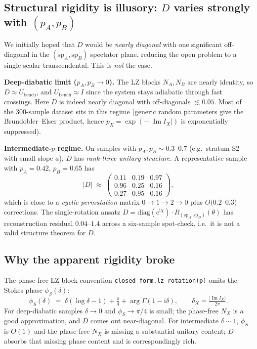 \documentclass[11pt]{article}
\newcommand{\ii}{\mathrm i}\newcommand{\dd}{\mathrm d}
\newcommand{\im}{\operatorname{Im}}
\begin{document}
\subsection{Structural rigidity is illusory: $D$ varies strongly with $(p_A,p_B)$}

We initially hoped that $D$ would be \emph{nearly diagonal} with one
significant off-diagonal in the $(\mathrm{sp}_A,\mathrm{sp}_B)$
spectator plane, reducing the open problem to a single scalar
transcendental. This is \emph{not} the case.

\textbf{Deep-diabatic limit ($p_A,p_B\to 0$).} The LZ blocks $N_A,N_B$
are nearly identity, so $D\approx U_{\text{bench}}$, and
$U_{\text{bench}}\approx I$ since the system stays adiabatic through
fast crossings. Here $D$ is indeed nearly diagonal with off-diagonals
$\lesssim 0.05$. Most of the 300-sample dataset sits in this regime
(generic random parameters give the Brundobler--Elser product, hence
$p_X = \exp(-|\im I_X|)$ is exponentially suppressed).

\textbf{Intermediate-$p$ regime.} On samples with $p_A,p_B \sim 0.3$--$0.7$
(e.g.\ stratum S2 with small slope $a$), $D$ has \emph{rank-three
unitary structure}. A representative sample with $p_A=0.42$, $p_B=0.65$
has
\[
|D|\;\approx\;\begin{pmatrix}
0.11 & 0.19 & 0.97\\
0.96 & 0.25 & 0.16\\
0.27 & 0.95 & 0.16
\end{pmatrix},
\]
which is close to a \emph{cyclic permutation} matrix $0\to 1\to 2\to 0$
plus $O(0.2$--$0.3)$ corrections. The single-rotation ansatz
$D = \mathrm{diag}(\mathrm e^{\ii\chi})\cdot
R_{(\mathrm{sp}_A,\mathrm{sp}_B)}(\theta)$ has reconstruction residual
$0.04$--$1.4$ across a six-sample spot-check, i.e.\ it is not a valid
structure theorem for $D$.

\subsection{Why the apparent rigidity broke}

The phase-free LZ block convention \texttt{closed\_form.lz\_rotation(p)}
omits the Stokes phase $\phi_S(\delta)$:
\[
\phi_S(\delta) \;=\; \delta(\log\delta - 1) + \tfrac{\pi}{4} + \arg\Gamma(1-\ii\delta),
\qquad \delta_X = \tfrac{|\im I_X|}{2\pi}.
\]
For deep-diabatic samples $\delta\to 0$ and $\phi_S\to \pi/4$ is small;
the phase-free $N_X$ is a good approximation, and $D$ comes out
near-diagonal. For intermediate $\delta\sim 1$, $\phi_S$ is $O(1)$ and
the phase-free $N_X$ is missing a substantial unitary content; $D$
absorbs that missing phase content and is correspondingly rich.
\end{document}
